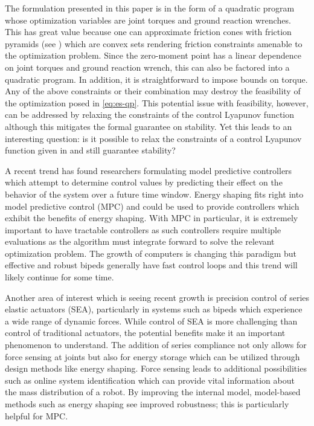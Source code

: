 The formulation presented in this paper is in the form of a quadratic program
whose optimization variables are joint torques and ground reaction wrenches.
%
This has great value because one can approximate friction cones with friction
pyramids (see \cite{Grizzle2014}) which are convex sets rendering friction
constraints amenable to the optimization problem.
%
Since the zero-moment point has a linear dependence on joint torques and ground
reaction wrench, this can also be factored into a quadratic program.
%
In addition, it is straightforward to impose bounds on torque.
%
Any of the above constraints or their combination may destroy the
feasibility of the optimization posed in \eqref{eq:es-qp}.
%
This potential issue with feasibility, however, can be addressed by relaxing the
constraints of the control Lyapunov function although this mitigates the formal
guarantee on stability.
%
Yet this leads to an interesting question:
%
is it possible to relax the constraints of a control Lyapunov function given in
 and still guarantee stability?


A recent trend has found researchers formulating model predictive controllers
which attempt to determine control values by predicting their effect on the
behavior of the system over a future time window.
%
Energy shaping fits right into model predictive control (MPC) and could be used
to provide controllers which exhibit the benefits of energy shaping.
%
With MPC in particular, it is extremely important to have tractable controllers
as such controllers require multiple evaluations as the algorithm must integrate
forward to solve the relevant optimization problem.
%
The growth of computers is changing this paradigm but effective and robust
bipeds generally have fast control loops and this trend will likely continue for
some time.
%


Another area of interest which is seeing recent growth is precision control of
series elastic actuators (SEA), particularly in systems such as bipeds which
experience a wide range of dynamic forces.
%
While control of SEA is more challenging than control of traditional actuators,
the potential benefits make it an important phenomenon to understand.
%
The addition of series compliance not only allows for force sensing at joints
but also for energy storage which can be utilized through design methods like
energy shaping.
%
Force sensing leads to additional possibilities such as online system
identification which can provide vital information about the mass distribution
of a robot.
%
By improving the internal model, model-based methods such as energy shaping see
improved robustness; this is particularly helpful for MPC.


